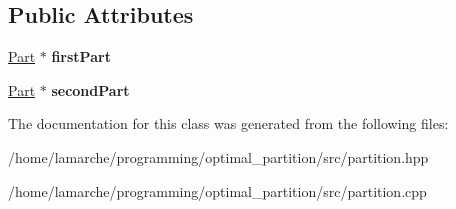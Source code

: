 \subsection*{Public Attributes}
\begin{DoxyCompactItemize}
\item 
\hypertarget{classBiPart_a5846464cf88602318aa6c4f26976255b}{\hyperlink{classPart}{Part} $\ast$ {\bfseries first\-Part}}\label{classBiPart_a5846464cf88602318aa6c4f26976255b}

\item 
\hypertarget{classBiPart_a3497ede9e6226b6b71b39e481d07c63e}{\hyperlink{classPart}{Part} $\ast$ {\bfseries second\-Part}}\label{classBiPart_a3497ede9e6226b6b71b39e481d07c63e}

\end{DoxyCompactItemize}


The documentation for this class was generated from the following files\-:\begin{DoxyCompactItemize}
\item 
/home/lamarche/programming/optimal\-\_\-partition/src/partition.\-hpp\item 
/home/lamarche/programming/optimal\-\_\-partition/src/partition.\-cpp\end{DoxyCompactItemize}
